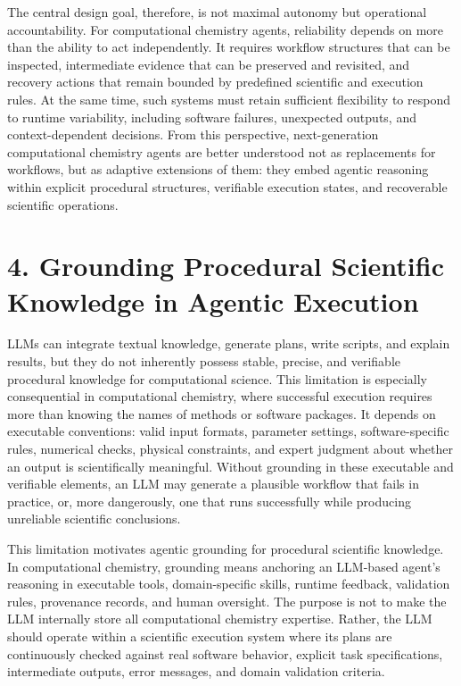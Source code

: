 \documentclass[journal=jacsat,manuscript=article]{achemso}
\begin{document}
The central design goal, therefore, is not maximal autonomy but operational accountability. For computational chemistry agents, reliability depends on more than the ability to act independently. It requires workflow structures that can be inspected, intermediate evidence that can be preserved and revisited, and recovery actions that remain bounded by predefined scientific and execution rules. At the same time, such systems must retain sufficient flexibility to respond to runtime variability, including software failures, unexpected outputs, and context-dependent decisions. From this perspective, next-generation computational chemistry agents are better understood not as replacements for workflows, but as adaptive extensions of them: they embed agentic reasoning within explicit procedural structures, verifiable execution states, and recoverable scientific operations.

\section{4. Grounding Procedural Scientific Knowledge in Agentic Execution}

LLMs can integrate textual knowledge, generate plans, write scripts, and explain results, but they do not inherently possess stable, precise, and verifiable procedural knowledge for computational science. This limitation is especially consequential in computational chemistry, where successful execution requires more than knowing the names of methods or software packages. It depends on executable conventions: valid input formats, parameter settings, software-specific rules, numerical checks, physical constraints, and expert judgment about whether an output is scientifically meaningful. Without grounding in these executable and verifiable elements, an LLM may generate a plausible workflow that fails in practice, or, more dangerously, one that runs successfully while producing unreliable scientific conclusions.

This limitation motivates agentic grounding for procedural scientific knowledge. In computational chemistry, grounding means anchoring an LLM-based agent's reasoning in executable tools, domain-specific skills, runtime feedback, validation rules, provenance records, and human oversight. The purpose is not to make the LLM internally store all computational chemistry expertise. Rather, the LLM should operate within a scientific execution system where its plans are continuously checked against real software behavior, explicit task specifications, intermediate outputs, error messages, and domain validation criteria.
\end{document}

